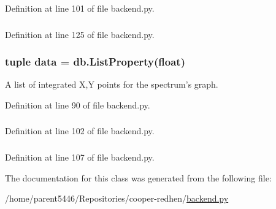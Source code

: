 Definition at line 101 of file backend.py.\hypertarget{classbackend_1_1_spectrum_a511ae0b1c13f95e5f08f1a0dd3da3d93}{
\subsubsection[{data}]{}}
\label{classbackend_1_1_spectrum_a511ae0b1c13f95e5f08f1a0dd3da3d93}


Definition at line 125 of file backend.py.\hypertarget{classbackend_1_1_spectrum_aa7a0efb8690a34f61a95b00cc723ca27}{
\subsubsection[{data}]{\setlength{\rightskip}{0pt plus 5cm}tuple {\bf data} = db.ListProperty(float)}}
\label{classbackend_1_1_spectrum_aa7a0efb8690a34f61a95b00cc723ca27}


A list of integrated X,Y points for the spectrum's graph. 

Definition at line 90 of file backend.py.\hypertarget{classbackend_1_1_spectrum_a7aead736a07eaf25623ad7bfa1f0ee2d}{
\subsubsection[{type}]{}}
\label{classbackend_1_1_spectrum_a7aead736a07eaf25623ad7bfa1f0ee2d}


Definition at line 102 of file backend.py.\hypertarget{classbackend_1_1_spectrum_a3f6f55ba521257932bb08684e0181fa1}{
\subsubsection[{xy}]{}}
\label{classbackend_1_1_spectrum_a3f6f55ba521257932bb08684e0181fa1}


Definition at line 107 of file backend.py.

The documentation for this class was generated from the following file:\begin{DoxyCompactItemize}
\item 
/home/parent5446/Repositories/cooper-\/redhen/\hyperlink{backend_8py}{backend.py}\end{DoxyCompactItemize}

